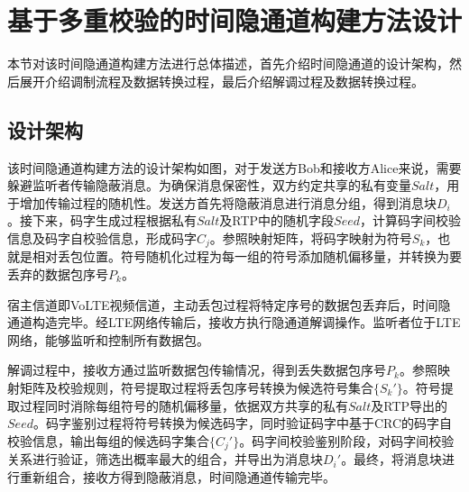 \section{基于多重校验的时间隐通道构建方法设计}
\label{chap:hash:designation}

本节对该时间隐通道构建方法进行总体描述，首先介绍时间隐通道的设计架构，然后展开介绍调制流程及数据转换过程，最后介绍解调过程及数据转换过程。

\subsection{设计架构}
\label{chap:hash:designation:model}


该时间隐通道构建方法的设计架构如图，对于发送方Bob和接收方Alice来说，需要躲避监听者传输隐蔽消息。为确保消息保密性，双方约定共享的私有变量$Salt$，用于增加传输过程的随机性。发送方首先将隐蔽消息进行消息分组，得到消息块$D_{i}$。接下来，码字生成过程根据私有$Salt$及RTP中的随机字段$Seed$，计算码字间校验信息及码字自校验信息，形成码字$C_{j}$。参照映射矩阵，将码字映射为符号$S_{k}$，也就是相对丢包位置。符号随机化过程为每一组的符号添加随机偏移量，并转换为要丢弃的数据包序号$P_{k}$。

宿主信道即VoLTE视频信道，主动丢包过程将特定序号的数据包丢弃后，时间隐通道构造完毕。经LTE网络传输后，接收方执行隐通道解调操作。监听者位于LTE网络，能够监听和控制所有数据包。

解调过程中，接收方通过监听数据包传输情况，得到丢失数据包序号$P_{k}$。参照映射矩阵及校验规则，符号提取过程将丢包序号转换为候选符号集合$\{S_{k}'\}$。符号提取过程同时消除每组符号的随机偏移量，依据双方共享的私有$Salt$及RTP导出的$Seed$。码字鉴别过程将符号转换为候选码字，同时验证码字中基于CRC的码字自校验信息，输出每组的候选码字集合$\{C_{j}'\}$。码字间校验鉴别阶段，对码字间校验关系进行验证，筛选出概率最大的组合，并导出为消息块$D_{i}'$。最终，将消息块进行重新组合，接收方得到隐蔽消息，时间隐通道传输完毕。

